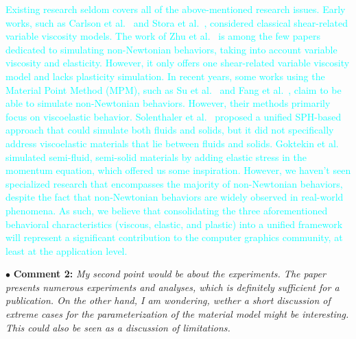 \documentclass[12pt,a4paper]{article}
\newcommand{\revised}[1]{\textcolor{cyan}{#1}}
\begin{document}
\revised{
Existing research seldom covers all of the above-mentioned research issues. Early works, such as Carlson et al.~\cite{Carlson2002} and Stora et al.~\cite{Stora1999}, considered classical shear-related variable viscosity models. The work of Zhu et al.~\cite{Zhu2015-nonNewton} is among the few papers dedicated to simulating non-Newtonian behaviors, taking into account variable viscosity and elasticity. However, it only offers one shear-related variable viscosity model and lacks plasticity simulation. In recent years, some works using the Material Point Method (MPM), such as Su et al.~\cite{Su2021} and Fang et al.~\cite{Fang2019-sillyRubber}, claim to be able to simulate non-Newtonian behaviors. However, their methods primarily focus on viscoelastic behavior. Solenthaler et al.~\cite{Solenthaler2007} proposed a unified SPH-based approach that could simulate both fluids and solids, but it did not specifically address viscoelastic materials that lie between fluids and solids. Goktekin et al.~\cite{Goktekin2004} simulated semi-fluid, semi-solid materials by adding elastic stress in the momentum equation, which offered us some inspiration. 
 However, we haven't seen specialized research that encompasses the majority of non-Newtonian behaviors, despite the fact that non-Newtonian behaviors are widely observed in real-world phenomena. As such, we believe that consolidating the three aforementioned behavioral characteristics (viscous, elastic, and plastic) into a unified framework will represent a significant contribution to the computer graphics community, at least at the application level. }
 
\vspace{0.4cm}
\noindent$\bullet$ \enspace \textbf{Comment 2:}
\textit{My second point would be about the experiments. The paper presents numerous experiments and analyses, which is definitely sufficient for a publication. On the other hand, I am wondering, wether a short discussion of extreme cases for the parameterization of the material model might be interesting. This could also be seen as a discussion of limitations.  }
\end{document}
